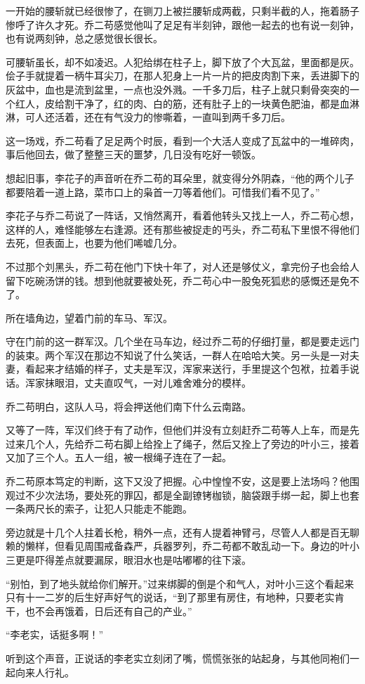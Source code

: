 一开始的腰斩就已经很惨了，在铡刀上被拦腰斩成两截，只剩半截的人，拖着肠子惨呼了许久才死。乔二苟感觉他叫了足足有半刻钟，跟他一起去的也有说一刻钟，也有说两刻钟，总之感觉很长很长。

可腰斩虽长，却不如凌迟。人犯给绑在柱子上，脚下放了个大瓦盆，里面都是灰。侩子手就提着一柄牛耳尖刀，在那人犯身上一片一片的把皮肉割下来，丢进脚下的灰盆中，血也是流到盆里，一点也没外溅。一千多刀后，柱子上就只剩骨突突的一个红人，皮给割干净了，红的肉、白的筋，还有肚子上的一块黄色肥油，都是血淋淋，可人还活着，还在有气没力的惨嘶着，一直叫到两千多刀后。

这一场戏，乔二苟看了足足两个时辰，看到一个大活人变成了瓦盆中的一堆碎肉，事后他回去，做了整整三天的噩梦，几日没有吃好一顿饭。

想起旧事，李花子的声音听在乔二苟的耳朵里，就变得分外阴森，“他的两个儿子都要陪着一道上路，菜市口上的枭首一刀等着他们。可惜我们看不见了。”

李花子与乔二苟说了一阵话，又悄然离开，看着他转头又找上一人，乔二苟心想，这样的人，难怪能够左右逢源。还有那些被捉走的丐头，乔二苟私下里恨不得他们去死，但表面上，也要为他们唏嘘几分。

不过那个刘黑头，乔二苟在他门下快十年了，对人还是够仗义，拿完份子也会给人留下吃碗汤饼的钱。想到他就要被处死，乔二苟心中一股兔死狐悲的感慨还是免不了。

所在墙角边，望着门前的车马、军汉。

守在门前的这一群军汉。几个坐在马车边，经过乔二苟的仔细打量，都是要走远门的装束。两个军汉在那边不知说了什么笑话，一群人在哈哈大笑。另一头是一对夫妻，看起来才结婚的样子，丈夫是军汉，浑家来送行，手里提这个包袱，拉着手说话。浑家抹眼泪，丈夫直叹气，一对儿难舍难分的模样。

乔二苟明白，这队人马，将会押送他们南下什么云南路。

又等了一阵，军汉们终于有了动作，但他们并没有立刻赶乔二苟等人上车，而是先过来几个人，先给乔二苟右脚上给拴上了绳子，然后又拴上了旁边的叶小三，接着又加了三个人。五人一组，被一根绳子连在了一起。

乔二苟原本笃定的判断，这下又没了把握。心中惶惶不安，这是要上法场吗？他围观过不少次法场，要处死的罪囚，都是全副镣铐枷锁，脑袋跟手绑一起，脚上也套一条两尺长的索子，让犯人只能走不能跑。

旁边就是十几个人拄着长枪，稍外一点，还有人提着神臂弓，尽管人人都是百无聊赖的懒样，但看见周围戒备森严，兵器罗列，乔二苟都不敢乱动一下。身边的叶小三更是吓得差点就要漏尿，眼泪水也是咕嘟嘟的往下滚。

“别怕，到了地头就给你们解开。”过来绑脚的倒是个和气人，对叶小三这个看起来只有十一二岁的后生好声好气的说话，“到了那里有房住，有地种，只要老实肯干，也不会再饿着，日后还有自己的产业。”

“李老实，话挺多啊！”

听到这个声音，正说话的李老实立刻闭了嘴，慌慌张张的站起身，与其他同袍们一起向来人行礼。
